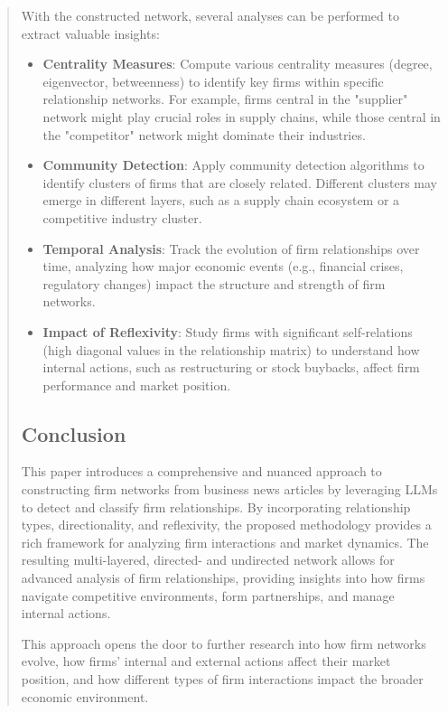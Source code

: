 \begin{quote}
With the constructed network, several analyses can be performed to extract valuable insights:
\begin{itemize}
    \item \textbf{Centrality Measures}: Compute various centrality measures (degree, eigenvector, betweenness) to identify key firms within specific relationship networks. For example, firms central in the "supplier" network might play crucial roles in supply chains, while those central in the "competitor" network might dominate their industries.
    \item \textbf{Community Detection}: Apply community detection algorithms to identify clusters of firms that are closely related. Different clusters may emerge in different layers, such as a supply chain ecosystem or a competitive industry cluster.
    \item \textbf{Temporal Analysis}: Track the evolution of firm relationships over time, analyzing how major economic events (e.g., financial crises, regulatory changes) impact the structure and strength of firm networks.
    \item \textbf{Impact of Reflexivity}: Study firms with significant self-relations (high diagonal values in the relationship matrix) to understand how internal actions, such as restructuring or stock buybacks, affect firm performance and market position.
\end{itemize}

\subsection{Conclusion}

This paper introduces a comprehensive and nuanced approach to constructing firm networks from business news articles by leveraging LLMs to detect and classify firm relationships. By incorporating relationship types, directionality, and reflexivity, the proposed methodology provides a rich framework for analyzing firm interactions and market dynamics. The resulting multi-layered, directed- and undirected network allows for advanced analysis of firm relationships, providing insights into how firms navigate competitive environments, form partnerships, and manage internal actions.

This approach opens the door to further research into how firm networks evolve, how firms' internal and external actions affect their market position, and how different types of firm interactions impact the broader economic environment.






\end{quote}

